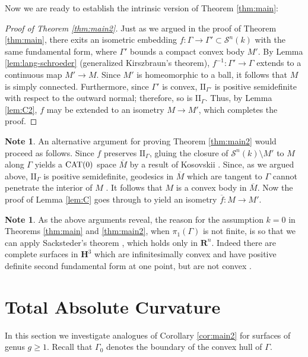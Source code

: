 \documentclass[11pt]{amsart}
\theoremstyle{definition}
\newtheorem{note}[theorem]{Note}
\newcommand{\ol}{\overline}
\newcommand{\R}{\mathbf{R}}
\newcommand{\ff}{\mathrm{I\!I}}
\begin{document}
Now we are ready to establish the intrinsic version of Theorem \ref{thm:main}:

\begin{proof}[Proof of Theorem \ref{thm:main2}]
Just as we argued in the proof of Theorem \ref{thm:main}, there exits an isometric embedding $f\colon\Gamma\to\Gamma'\subset\mathcal{S}^n(k)$ with the same fundamental form, where $\Gamma'$ bounds a compact convex body $M'$. By Lemma \ref{lem:lang-schroeder}  (generalized Kirszbraun's theorem), $f^{-1}\colon\Gamma'\to\Gamma$ extends to a continuous map $M'\to M$. Since $M'$ is homeomorphic to a ball, it follows that $M$ is simply connected. Furthermore, since $\Gamma'$ is convex, $\ff_{\Gamma'}$ is positive semidefinite with respect to the outward normal;  therefore, so is $\ff_\Gamma$. Thus, by Lemma \ref{lem:C2}, $f$ may be extended to an isometry $M\to M'$, which completes the proof.
\end{proof}

\begin{note}
An alternative argument for proving Theorem \ref{thm:main2} would proceed as follows. Since $f$ preserves $\ff_\Gamma$, gluing the closure of 
$\mathcal{S}^n(k)\setminus M'$ to $M$ along $\Gamma$ yields a $\textup{CAT}(0)$ space $\ol M$ by a result of Kosovskii \cite{kosovskii2004}. Since, as we argued above, $\ff_\Gamma$ is positive semidefinite, geodesics in $\ol M$ which are tangent to $\Gamma$ cannot penetrate the interior of $M$ \cite{bishop1974}. It follows that  $M$ is a convex body in $\ol M$. Now the proof of Lemma \ref{lem:C} goes through to yield an isometry $\ol f\colon M\to M'$.
\end{note}



\begin{note}
As the above arguments reveal, the reason for the assumption $k=0$ in Theorems \ref{thm:main} and \ref{thm:main2},  when $\pi_1(\Gamma)$ is not finite, is so that we can apply Sacksteder's theorem \cite{sacksteder1960}, which holds only in $\R^n$. Indeed there are complete surfaces in $\mathbf{H}^3$ which are infinitesimally convex and have positive definite second fundamental form at one point, but are not convex \cite[p. 84]{spivak:v4}.
\end{note}




\section{Total Absolute Curvature}\label{sec:higher}
In this section we investigate analogues of Corollary \ref{cor:main2} for surfaces of genus $g\geq 1$. Recall that $\Gamma_0$ denotes the boundary of the convex hull of $\Gamma$.
\end{document}

